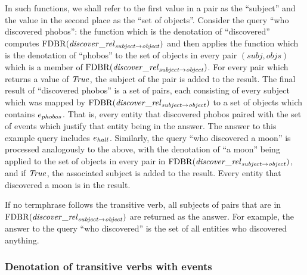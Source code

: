 \documentclass[../main.tex]{subfiles}
\begin{document}
\begin{refsection}
In such functions, we shall refer to the first value in a pair as the ``subject'' and the value in
the second place as the ``set of objects''.
Consider the query ``who discovered phobos'': the function which is the denotation
of ``discovered'' computes $\mathrm{FDBR}({\mathit{discover\_rel}_{\mathit{subject} \rightarrow \mathit{object}}})$ and then applies the function which is the
denotation of ``phobos'' to the set of objects in every pair $(\mathit{subj}, \mathit{objs})$ which is a member of
$\mathrm{FDBR}({\mathit{discover\_rel}_{\mathit{subject} \rightarrow \mathit{object}}})$. For every pair which returns a value of $\mathit{True}$, the subject of the pair is added to
the result. The final result of ``discovered
phobos'' is a set of pairs, each consisting of every subject which was mapped by $\mathrm{FDBR}({\mathit{\mathit{discover}\_rel}_{\mathit{subject} \rightarrow \mathit{object}}})$
to a set of objects which contains $e_{phobos}$. That is, every entity that discovered phobos paired with the set of events which justify that entity being in the answer. The
answer to this example query includes $e_{hall}$. Similarly, the query ``who discovered a moon'' is
processed analogously to the above, with the denotation of ``a moon'' being applied to the set of
objects in every pair in $\mathrm{FDBR}({\mathit{\mathit{discover}\_rel}_{\mathit{subject} \rightarrow \mathit{object}}})$, and if $\mathit{True}$, the associated subject is added to
the result. Every entity that discovered a moon is in the result.

If no termphrase follows the transitive verb, all subjects of pairs that are in
$\mathrm{FDBR}({\mathit{discover\_rel}_{\mathit{subject} \rightarrow \mathit{object}}})$ are returned as the answer. For example, the answer to the query
``who discovered'' is the set of all entities who discovered anything.

\subsubsection{Denotation of transitive verbs with events}
\label{ext:transevents}


\end{refsection}
\end{document}
